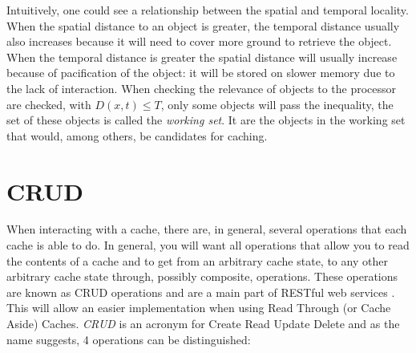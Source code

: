 \documentclass[pdftex,a4paper,12pt,twoside]{report}
\begin{document}
Intuitively, one could see a relationship between the spatial and temporal locality. When the spatial distance to an object is greater, the temporal distance usually also increases because it will need to cover more ground to retrieve the object. When the temporal distance is greater the spatial distance will usually increase because of pacification of the object: it will be stored on slower memory due to the lack of interaction.
When checking the relevance of objects to the processor are checked, with $D(x,t) \leq T$, only some objects will pass the inequality, the set of these objects is 
called the \emph{working set}. It are the objects in the working set that would, among others, be candidates for caching. 
\section{CRUD}
When interacting with a cache, there are, in general, several operations that each cache is able to do. In general, you will want all operations that allow you to read the contents of a cache and to get from an arbitrary cache state, to any other arbitrary cache state through, possibly composite, operations. These operations are known as CRUD operations and are a main part of RESTful web services \citep{battle2008bridging}. This will allow an easier implementation when using Read Through (or Cache Aside) Caches.
\emph{CRUD} is an acronym for Create Read Update Delete and as the name suggests, 4 operations can be distinguished:
\end{document}
